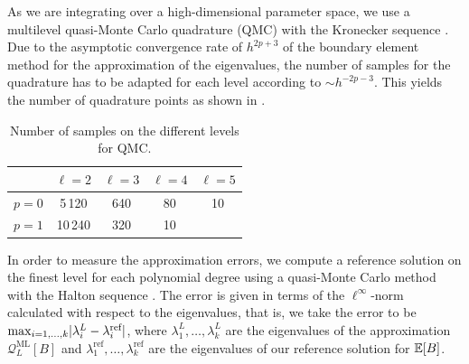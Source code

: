As we are integrating over a high-dimensional parameter space, we use a multilevel quasi-Monte Carlo quadrature (QMC) with the Kronecker sequence \cite{Dick_Kuo_Sloan_2013}.
Due to the asymptotic convergence rate of $h^{2p+3}$ of the boundary element method for the approximation of the eigenvalues, the number of samples for the quadrature has to be adapted for each level according to $\sim h^{-2p-3}$.
This yields the number of quadrature points as shown in .

\begin{table}[htb]
    \centering
\begin{tabular}{c c c c c}
    \hline
     & $\ell=2$ & $\ell=3$ & $\ell=4$ & $\ell = 5$ \\\hline
    $p = 0$ & 5\,120 & 640 & 80 & 10 \\\hline
    $p = 1$ & 10\,240 & 320 & 10 &  \\\hline
    \end{tabular}
    \medskip
    \caption{Number of samples on the different levels for QMC.}
    \label{tab:number-of-samples}
\end{table}

In order to measure the approximation errors, we compute a reference solution on the finest level for each polynomial degree using a quasi-Monte Carlo method with the Halton sequence \cite{Dick_Kuo_Sloan_2013}.
The error is given in terms of the $\ell^{\infty}$-norm calculated with respect to the eigenvalues, that is, we take the error to be $\max_{i=1,\ldots,k} \abs{\lambda_i^{L} - \lambda_i^{\text{ref}}}$, where $\lambda_1^{L},\ldots,\lambda_k^{L}$ are the eigenvalues of the approximation $\mathcal{Q}_L^{\text{ML}} [B]$ and $\lambda_1^{\text{ref}},\ldots,\lambda_k^{\text{ref}}$ are the eigenvalues of our reference solution for $\mathbb{E}[B]$.


